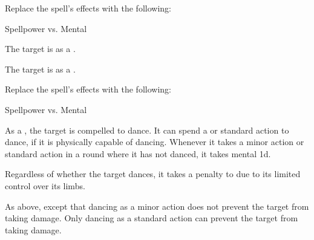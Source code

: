 


Replace the spell's effects with the following:
\begin{spellcontent}

\begin{augmenteffects}




\begin{spellattack}{Spellpower vs. Mental}


\spellsuccess The target is \disoriented as a .


\spellcritical The target is \confused as a .


\end{spellattack}





\end{augmenteffects}

\end{spellcontent}








Replace the spell's effects with the following:
\begin{spellcontent}

\begin{augmenteffects}




\begin{spellattack}{Spellpower vs. Mental}


\spellsuccess
As a , the target is compelled to dance.
It can spend a  or standard action to dance, if it is physically capable of dancing.
Whenever it takes a minor action or standard action in a round where it has not danced, it takes mental  \plus1d.

Regardless of whether the target dances, it takes a  penalty to  due to its limited control over its limbs.



\spellcritical
As above, except that dancing as a minor action does not prevent the target from taking damage.
Only dancing as a standard action can prevent the target from taking damage.



\end{spellattack}





\end{augmenteffects}

\end{spellcontent}





